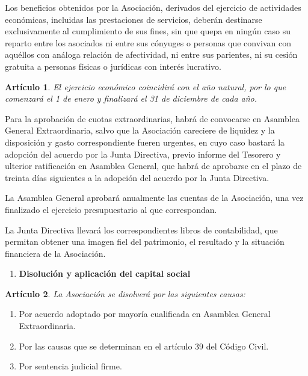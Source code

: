 \documentclass[a4paper,12pt]{article}
\theoremstyle{mystyle}		%
\newtheorem{art}{Artículo}	%
\begin{document}
\begin{onehalfspace}
Los beneficios obtenidos por la Asociación, derivados del ejercicio de actividades económicas, incluidas las prestaciones de servicios, deberán destinarse exclusivamente al cumplimiento de sus fines, sin que quepa en ningún caso su reparto entre los asociados ni entre sus cónyuges o personas que convivan con aquéllos con análoga relación de afectividad, ni entre sus parientes, ni su cesión gratuita a personas físicas o jurídicas con interés lucrativo.

\begin{art}
El ejercicio económico coincidirá con el año natural, por lo que comenzará el 1 de enero y finalizará el 31 de diciembre de cada año.
\end{art}

Para la aprobación de cuotas extraordinarias, habrá de convocarse en Asamblea General Extraordinaria, salvo que la Asociación careciere de liquidez y la disposición y gasto correspondiente fueren urgentes, en cuyo caso bastará la adopción del acuerdo por la Junta Directiva, previo informe del Tesorero y ulterior ratificación en Asamblea General, que habrá de aprobarse en el plazo de treinta días siguientes a la adopción del acuerdo por la Junta Directiva.

La Asamblea General aprobará anualmente las cuentas de la Asociación, una vez finalizado el ejercicio presupuestario al que correspondan.

La Junta Directiva llevará los correspondientes libros de contabilidad, que permitan obtener una imagen fiel del patrimonio, el resultado y la situación financiera de la Asociación.

\bigskip

\begin{enumerate}[resume*=capitulo]\centering
 \item \textbf{Disolución y aplicación del capital social}
\end{enumerate}

\begin{art}
La Asociación se disolverá por las siguientes causas:
\end{art}
\begin{enumerate}[label={\alph*)}]
 \item Por acuerdo adoptado por mayoría cualificada en Asamblea General Extraordinaria.
 \item Por las causas que se determinan en el artículo 39 del Código Civil.
 \item Por sentencia judicial firme.
\end{enumerate}


\end{onehalfspace}
\end{document}
